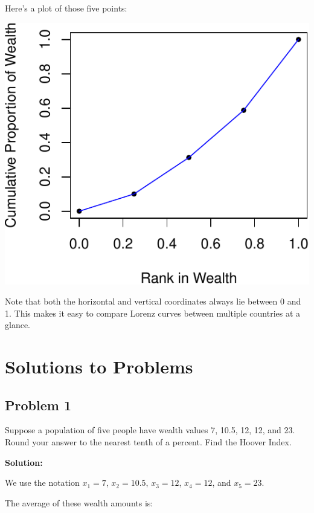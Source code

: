 \documentclass[12pt]{memoir}\usepackage[]{graphicx}\usepackage[table]{xcolor}
\makeatletter
\def\maxwidth{ %
  \ifdim\Gin@nat@width>\linewidth
    \linewidth
  \else
    \Gin@nat@width
  \fi
}
\newenvironment{knitrout}{}{} %
\makeatother
\begin{document}
Here's a plot of those five points:

\begin{center}
\begin{knitrout}
\color{fgcolor}
\includegraphics[width=\maxwidth]{figure/Lorenz0-1} 
\end{knitrout}
\end{center}

Note that both the horizontal and vertical coordinates always lie between 0 and 1.
This makes it easy to compare Lorenz curves between multiple countries at a 
glance.  

\newpage

\section*{Solutions to Problems}
\bigskip

\subsection*{Problem 1} 
Suppose a population of five people have wealth values
7, 10.5, 12, 12, and 23.  Round your answer to the nearest tenth of a percent.
Find the Hoover Index. 

\textbf{Solution:}

We use the notation $x_1 = 7$, $x_2 = 10.5$, $x_3 = 12$, $x_4 = 12$, and $x_5 = 23$.

The average of these wealth amounts is: 
\end{document}
